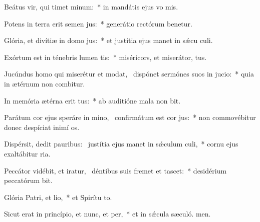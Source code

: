 \item Beátus vir, qui timet minum:~* in mandátis ejus vo mis.
\item Potens in terra erit semen jus:~* generátio rectórum benetur.
\item Glória, et divítiæ in domo jus:~* et justítia ejus manet in sǽcu culi.
\item Exórtum est in ténebris lumen tis:~* miséricors, et miserátor,  tus.
\item Jucúndus homo qui miserétur et modat,~\pscross{} dispónet sermónes suos in jucio:~* quia in ætérnum non combitur.
\item In memória ætérna erit tus:~* ab auditióne mala non bit.
\item Parátum cor ejus speráre in mino,~\pscross{} confirmátum est cor jus:~* non commovébitur donec despíciat inimí os.
\item Dispérsit, dedit pauribus:~\pscross{} justítia ejus manet in sǽculum culi,~* cornu ejus exaltábitur  ria.
\item Peccátor vidébit, et iratur,~\pscross{} déntibus suis fremet et tascet:~* desidérium peccatórum bit.
\item Glória Patri, et lio,~* et Spirítu to.
\item Sicut erat in princípio, et nunc, et per,~* et in sǽcula sæculó. men.
